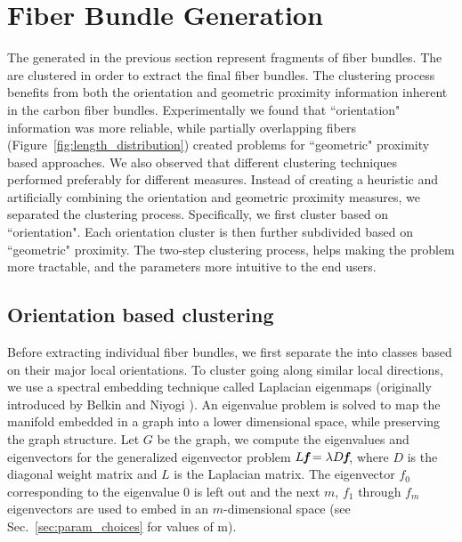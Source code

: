 \section{Fiber Bundle Generation}\label {subsec:fiber-bundles}
The \mt generated in the previous section represent fragments of fiber bundles. The \mt are clustered in order to extract the final fiber bundles. The clustering process benefits from both the orientation and geometric proximity information inherent in the carbon fiber bundles. Experimentally we found that ``orientation" information was more reliable, while partially overlapping fibers (Figure~\ref{fig:length_distribution}) created problems for ``geometric" proximity based approaches. We also observed that different clustering techniques performed preferably for different measures. 
Instead of creating a heuristic and artificially combining the orientation and geometric proximity measures, we separated the clustering process. 
Specifically, we first cluster based on ``orientation". Each orientation cluster is then further subdivided based on ``geometric" proximity.
The two-step clustering process, helps making the problem more tractable, and the parameters more intuitive to the end users. 
\subsection{Orientation based clustering}
\label {subsec:orientation_clustering}
Before extracting individual fiber bundles, we first separate the \mt into classes based on their major local orientations. To cluster \mt going along similar local directions, we use a spectral embedding technique called Laplacian eigenmaps (originally introduced by Belkin and Niyogi \cite{Belkin01}). An eigenvalue problem is solved to map the manifold embedded in a graph into a lower dimensional space, while preserving the graph structure. 
Let $G$ be the graph, we compute the eigenvalues and eigenvectors for the generalized eigenvector problem $L\textit{\textbf{f}}=\lambda D\textit{\textbf{f}}$,
where $D$ is the diagonal weight matrix and $L$ is the Laplacian matrix. The eigenvector \textbf{${f}_{0}$} corresponding to the eigenvalue 0 is left out and the next $m$, {\textbf{${f}_{1}$} through \textbf{${f}_{m}$}} eigenvectors are used to embed in an $m$-dimensional space (see Sec.~\ref{sec:param_choices} for values of m). 

